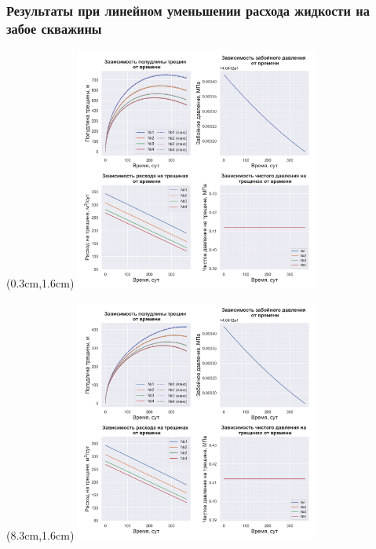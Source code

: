 \documentclass{beamer}
\begin{document}
\begin{frame}
\frametitle{Результаты при линейном уменьшении расхода жидкости на забое скважины}

\begin{textblock*}{8cm}(0.3cm,1.6cm)
\includegraphics[width=8cm]{myimage5.jpg}
\end{textblock*}

\begin{textblock*}{8cm}(8.3cm,1.6cm)
%
  {\includegraphics[width=8cm]{myimage6.jpg}}
\end{textblock*}

\end{frame}
\end{document}
